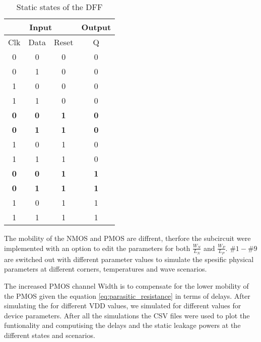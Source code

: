 \begin{table}[H]
    \centering
    \caption{Static states of the DFF}
    \label{tab:static_states}
    \begin{tabular}{cccc}
        \hline
        \multicolumn{3}{c}{Input}                                 & Output                          \\ \hline
        Clk                             & Data       & Reset      & Q                               \\ \hline
        0                               & 0          & 0          & 0                               \\
        0                               & 1          & 0          & 0                               \\
        1                               & 0          & 0          & 0                               \\
        1                               & 1          & 0          & 0                               \\ \hline
        \multicolumn{1}{|c}{\textbf{0}} & \textbf{0} & \textbf{1} & \multicolumn{1}{c|}{\textbf{0}} \\ \hline
        \multicolumn{1}{|c}{\textbf{0}} & \textbf{1} & \textbf{1} & \multicolumn{1}{c|}{\textbf{0}} \\ \hline
        1                               & 0          & 1          & 0                               \\
        1                               & 1          & 1          & 0                               \\ \hline
        \multicolumn{1}{|c}{\textbf{0}} & \textbf{0} & \textbf{1} & \multicolumn{1}{c|}{\textbf{1}} \\ \hline
        \multicolumn{1}{|c}{\textbf{0}} & \textbf{1} & \textbf{1} & \multicolumn{1}{c|}{\textbf{1}} \\ \hline
        1                               & 0          & 1          & 1                               \\
        1                               & 1          & 1          & 1                              
    \end{tabular}
\end{table}

The mobility of the NMOS and PMOS are diffrent, therfore the subcircuit were implemented with an option to edit the parameters for both $\frac{W_N}{L_N}$ and $\frac{W_P}{L_P}$. $\#1-\#9$ are switched out with different parameter values to simulate the spesific physical parameters at different corners, temperatures and wave scenarios.

The increased PMOS channel Width is to compensate for the lower mobility of the PMOS given the equation \ref{eq:parasitic_resistance} in terms of delays. After simulating the for different VDD values, we simulated for different values for device parameters. After all the simulations the CSV files were used to plot the funtionality and computising the delays and the static leakage powers at the different states and scenarios. 
